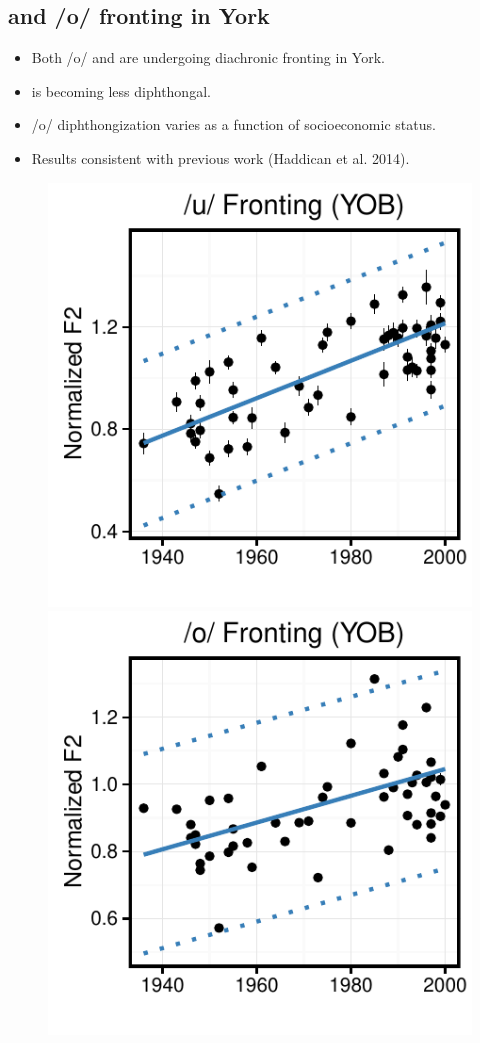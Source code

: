 \documentclass[a0,portrait]{a0poster}
\begin{document}
\begin{multicols}{4}
\section*{ and /o/ fronting in York}
\normalsize
\begin{itemize}
\item{Both /o/ and  are undergoing diachronic fronting in York.}
\item{ is becoming less diphthongal.}
\item{/o/ diphthongization varies as a function of socioeconomic status.}
\item{Results consistent with previous work (Haddican et al. 2014).}
\end{itemize}
\begin{figure}[H]
\centering
\includegraphics[scale=1.65]{u_fronting_yob.pdf}\includegraphics[scale=1.65]{o_fronting_yob.pdf} 

\end{figure}
\end{multicols}
\end{document}
